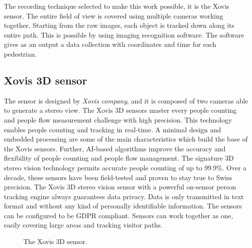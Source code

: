 \documentclass[class=article, crop=false]{standalone}
\begin{document}
The recording technique selected to make this work possible, it is the Xovis sensor. 
The entire field of view is covered using multiple cameras working together. 
Starting from the raw images, each object is tracked down along its entire path. 
This is possible by using imaging recognition software. 
The software gives as an output a data collection with coordinates and time for each pedestrian.



\subsection{Xovis 3D sensor}  %

The sensor is designed by \emph{Xovis company}, and it is composed of two cameras able to generate a stereo view. 
The Xovis 3D sensors master every people counting and people flow measurement challenge with high precision. 
This technology enables people counting and tracking in real-time. 
A minimal design and embedded processing are some of the main characteristics which build the base of the Xovis sensors. 
Further, AI-based algorithms improve the accuracy and flexibility of people counting and people flow management. 
The signature 3D stereo vision technology permits accurate people counting of up to 99.9\%. 
Over a decade, these sensors have been field-tested and proven to stay true to Swiss precision. 
The Xovis 3D stereo vision sensor with a powerful on-sensor person tracking engine always guarantees data privacy. 
Data is only transmitted in text format and without any kind of personally identifiable information. 
The sensors can be configured to be GDPR compliant. 
Sensors can work together as one, easily covering large areas and tracking visitor paths.
\begin{figure}[h]
    \centering
    \quad\quad
    \caption{The Xovis 3D sensor.}
    \label{fig:Xovis_sensor}
\end{figure}

 
\end{document}
